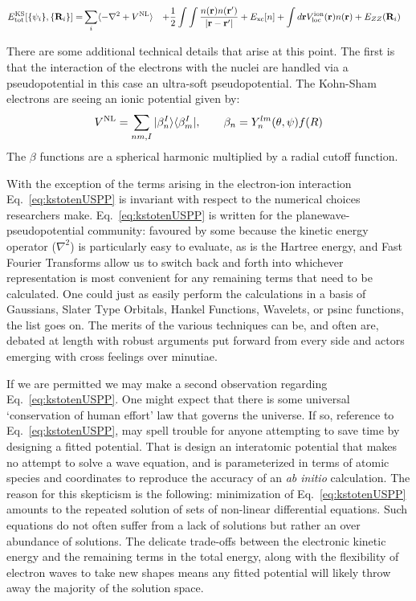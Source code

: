 \begin{align}
\label{eq:kstotenUSPP}
E^{\rm KS}_{\rm tot}[\{\psi_i\},\{{\bf R}_{i}\}] =  & \sum_{i}\langle -\nabla^{2} + V^{\rm NL} \rangle
                                           &+ \frac{1}{2}\int\int \frac{n({\bf r})n({\bf r}')}{|{\bf r}-{\bf r}'|}
                                           &+ E_{\rm xc}[n] + \int d{\bf r} V^{\rm ion}_{\rm loc}({\bf r})n({\bf r}) + E_{ZZ}({{\bf R}_{i}})
\end{align}

There are some additional technical details that arise at this point.
The first is that the interaction of the electrons with the nuclei are handled via a pseudopotential
in this case an ultra-soft pseudopotential\cite{vanderbilt90}. The Kohn-Sham electrons are 
seeing an ionic potential given by:
%
\begin{equation}
V^{\rm NL} =  \sum_{nm,I} |\beta_{n}^{I} \rangle \langle \beta_{m}^{I}|, \qquad \beta_{n} = Y^{lm}_{n}(\theta,\psi)f(R)
\end{equation}
%
The $\beta$ functions are a spherical harmonic multiplied by a radial cutoff function.

With the exception of the terms arising in the electron-ion interaction
Eq.~\ref{eq:kstotenUSPP} is invariant with respect to the numerical choices researchers make. 
Eq.~\ref{eq:kstotenUSPP} is written for the planewave-pseudopotential community:
favoured by some because the kinetic energy operator ($\nabla^{2}$) is particularly easy to evaluate, 
as is the Hartree energy, and Fast Fourier Transforms allow us to switch back and forth into whichever
representation is most convenient for any remaining terms that need to be calculated. 
One could just as easily perform the calculations
in a basis of Gaussians, Slater Type Orbitals, Hankel Functions, Wavelets, or psinc functions, the list goes on.
The merits of the various techniques can be, and often are, debated at length with
robust arguments put forward from every side and actors emerging with
cross feelings over minutiae. 

If we are permitted we may make a second observation regarding Eq.~\ref{eq:kstotenUSPP}. 
One might expect that there is some universal `conservation of human effort' 
law that governs the universe. If so, reference to Eq.~\ref{eq:kstotenUSPP},
may spell trouble for anyone attempting to save time by designing a
fitted potential. That is design an interatomic potential that makes
no attempt to solve a wave equation, and is parameterized in terms 
of atomic species and coordinates
to reproduce the accuracy of an \textit{ab initio} calculation. 
The reason for this skepticism is the following: minimization of Eq.~\ref{eq:kstotenUSPP} 
amounts to the repeated solution of sets of non-linear differential equations.
Such equations do not often suffer from a lack of solutions but rather an
over abundance of solutions\cite{haydock97}. The delicate trade-offs between 
the electronic kinetic energy and the remaining terms in the total energy, along with
the flexibility of electron waves to take new shapes means
any fitted potential will likely throw away the majority 
of the solution space.

